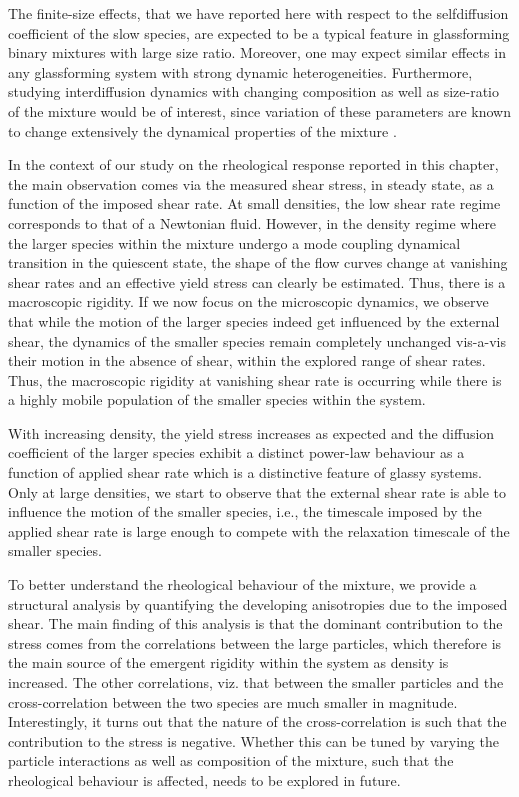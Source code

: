 The finite-size effects, that we have reported here with respect to the selfdiffusion coefficient of the slow species, are expected to be a typical feature in glassforming binary mixtures with large size ratio. Moreover, one may expect similar effects in any glassforming system with strong dynamic heterogeneities. {Furthermore, studying interdiffusion dynamics with changing composition as well as size-ratio of the mixture would be of interest, since variation of these parameters are known to change extensively the dynamical properties of the mixture \cite{zac2005, vinaySoft}}.

In the context of our study on the rheological response reported in this chapter, the main observation comes via the measured shear stress, in steady state, as a function of the imposed shear rate. At small densities, the low shear rate regime corresponds to that of a Newtonian fluid. However, in the density regime where the larger species within the mixture undergo a mode coupling dynamical transition in the quiescent state, the shape of the flow curves change at vanishing shear rates and an effective yield stress can clearly be estimated. Thus, there is a macroscopic rigidity. If we now focus on the microscopic dynamics, we observe that while the motion of the larger species indeed get influenced by the external shear, the dynamics of the smaller species remain completely unchanged vis-a-vis their motion in the absence of shear, within the explored range of shear rates. Thus, the macroscopic rigidity at vanishing shear rate is occurring while there is a highly mobile population of the smaller species within the system.

With increasing density, the yield stress increases as expected and the diffusion coefficient of the larger species exhibit a distinct power-law behaviour as a function of applied shear rate which is a distinctive feature of glassy systems. Only at large densities, we start to observe that the external shear rate is able to influence the motion of the smaller species, i.e., the timescale imposed by the applied shear rate is large enough to compete with the relaxation timescale of the smaller species.

To better understand the rheological behaviour of the mixture, we provide a structural analysis by quantifying the developing anisotropies due to the imposed shear. The main finding of this analysis is that the dominant contribution to the stress comes from the correlations between the large particles, which therefore is the main source of the emergent rigidity within the system as density is increased. The other correlations, viz. that between the smaller particles and the cross-correlation between the two species are much smaller in magnitude. Interestingly, it turns out that the nature of the cross-correlation is such that the contribution to the stress is negative. Whether this can be tuned by varying the particle interactions as well as composition of the mixture, such that the rheological behaviour is affected, needs to be explored in future.

